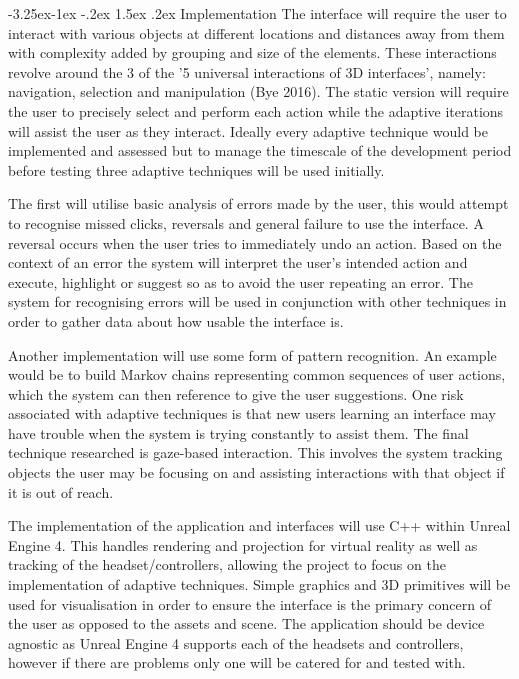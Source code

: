 \documentclass[9pt,twocolumn]{article}
\makeatletter
\renewcommand{\subsection}{\@startsection{subsection}{2}{\z@}%
             {-3.25ex\@plus -1ex \@minus -.2ex}%
             {1.5ex \@plus .2ex}%
             {\normalfont\large\scshape\bfseries}}
\makeatother
\begin{document}
\subsection{Implementation}
The interface will require the user to interact with various objects at different locations and distances away from them with complexity added by grouping and size of the elements. These interactions revolve around the 3 of the '5 universal interactions of 3D interfaces', namely: navigation, selection and manipulation (Bye 2016). The static version will require the user to precisely select and perform each action while the adaptive iterations will assist the user as they interact. Ideally every adaptive technique would be implemented and assessed but to manage the timescale of the development period before testing three adaptive techniques will be used initially.

The first will utilise basic analysis of errors made by the user, this would attempt to recognise missed clicks, reversals and general failure to use the interface. A reversal occurs when the user tries to immediately undo an action. Based on the context of an error the system will interpret the user's intended action and execute, highlight or suggest so as to avoid the user repeating an error. The system for recognising errors will be used in conjunction with other techniques in order to gather data about how usable the interface is.

Another implementation will use some form of pattern recognition. An example would be to build Markov chains representing common sequences of user actions, which the system can then reference to give the user suggestions. One risk associated with adaptive techniques is that new users learning an interface may have trouble when the system is trying constantly to assist them. The final technique researched is gaze-based interaction. This involves the system tracking objects the user may be focusing on and assisting interactions with that object if it is out of reach.

The implementation of the application and interfaces will use C++ within Unreal Engine 4. This handles rendering and projection for virtual reality as well as tracking of the headset/controllers, allowing the project to focus on the implementation of adaptive techniques. Simple graphics and 3D primitives will be used for visualisation in order to ensure the interface is the primary concern of the user as opposed to the assets and scene. The application should be device agnostic as Unreal Engine 4 supports each of the headsets and controllers, however if there are problems only one will be catered for and tested with. 
\end{document}
